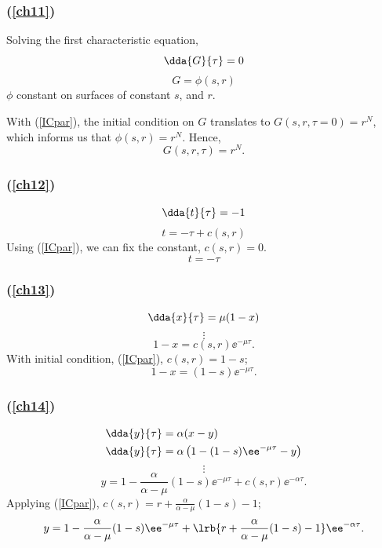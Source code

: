 \subsubsection*{(\ref{ch11})}
Solving the first characteristic equation,
$$\dda{G}{\tau} = 0$$
$$G = \phi(s,r)$$
$\phi$ constant on surfaces of constant $s$, and $r$.\par
With  (\ref{ICpar}), the initial condition on $G$ translates to $G(s,r,\tau=0) = r^N$, which informs us that $\phi(s,r) = r^N$. Hence,
\begin{equation}
\label{GrN}
G(s,r,\tau) = r^N.
\end{equation}



\subsubsection*{(\ref{ch12})}
$$\dda{t}{\tau} = -1$$
$$t = -\tau + c(s,r)$$
Using (\ref{ICpar}), we can fix the constant, $c(s,r) = 0$.
\begin{equation}
\label{minustau}
t = -\tau
\end{equation}


\subsubsection*{(\ref{ch13})}
$$\dda{x}{\tau} = \mu(1-x)$$
$$\vdots$$
$$1-x = c(s,r) \ee^{-\mu \tau}.$$
With initial condition, (\ref{ICpar}), $c(s,r) = 1-s$;
\begin{equation}
\label{sandxwithtau}
1-x = (1-s) \ee^{-\mu \tau}.
\end{equation}


\subsubsection*{(\ref{ch14})}

\begin{align*}
\dda{y}{\tau} &= \alpha(x-y)\\
\dda{y}{\tau} &= \alpha\left(1-(1-s) \ee^{-\mu \tau} -y\right)
\end{align*}
$$\vdots$$
$$y = 1 - \frac{\alpha}{\alpha-\mu}(1-s)\ee^{-\mu\tau} + c(s,r)\ee^{-\alpha\tau}.$$
Applying (\ref{ICpar}), $c(s,r) = r + \frac{\alpha}{\alpha-\mu}(1-s) -1$;
\begin{equation}
\label{ywithr1}
y = 1 - \frac{\alpha}{\alpha-\mu}(1-s)\ee^{-\mu\tau} + \lrb{r + \frac{\alpha}{\alpha-\mu}(1-s) -1}\ee^{-\alpha\tau}.
\end{equation}

